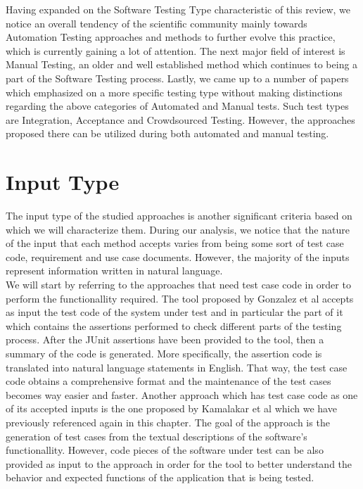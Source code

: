 Having expanded on the Software Testing Type characteristic of this review, we notice an overall tendency of the scientific community mainly towards Automation Testing approaches and methods to further 
evolve this practice, which is currently gaining a lot of attention. The next major field of interest is Manual Testing, an older and well established method which continues to being a part of the Software 
Testing process. Lastly, we came up to a number of papers which emphasized on a more specific testing type without making distinctions regarding the above categories of Automated and Manual tests. Such test 
types are Integration, Acceptance and Crowdsourced Testing. However, the approaches proposed there can be utilized during both automated and manual testing.

\section{Input Type}
The input type of the studied approaches is another significant criteria based on which we will characterize them. During our analysis, we notice 
that the nature of the input that each method accepts varies from being some sort of test case code, requirement and use case documents. However, the 
majority of the inputs represent information written in natural language.\\

We will start by referring to the approaches that need test case code in order to perform the functionallity required. The tool proposed by Gonzalez et al \cite{10.1145/3283812.3283819} accepts 
as input the test code of the system under test and in particular the part of it which contains the assertions performed to check different parts of the testing 
process. After the JUnit assertions have been provided to the tool, then a summary of the code is generated. More specifically, the assertion code 
is translated into natural language statements in English. That way, the test case code obtains a comprehensive format and the maintenance 
of the test cases becomes way easier and faster. Another approach which has test case code as one of its accepted inputs is the one proposed by 
Kamalakar et al \cite{kamalakar2013automatically} which we have previously referenced again in this chapter. The goal of the approach is the generation 
of test cases from the textual descriptions of the software's functionallity. However, code pieces of the software under test can be also provided as input 
to the approach in order for the tool to better understand the behavior and expected functions of the application that is being tested.\\

